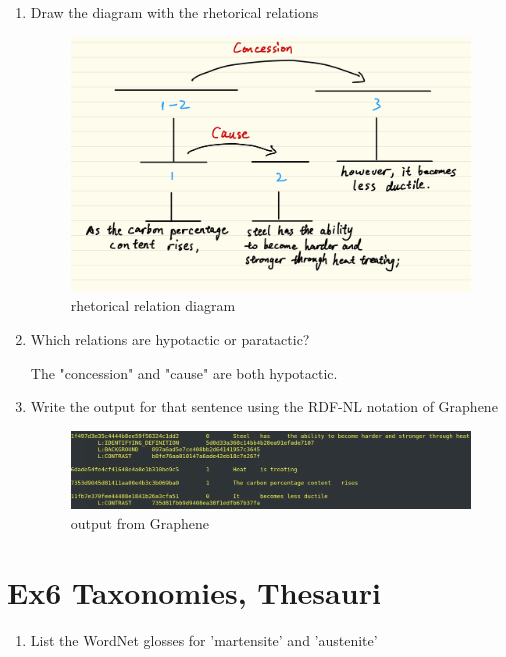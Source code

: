 \documentclass[12pt]{article}
\begin{document}
{\begin{enumerate}[1.]
	satellites: "As the carbon percentage content rises, steel has the ability to become harder 
	and stronger through heat treating;"
	\item Draw the diagram with the rhetorical relations
	\begin{figure}[ht]
		\centering
		\includegraphics[scale=0.15]{figs/rhetorical_structure.jpg}
		\caption{rhetorical relation diagram}
		\label{fig:label6}
	\end{figure}
	\item Which relations are hypotactic or paratactic?
	
	The "concession" and "cause" are both hypotactic.
	\item Write the output for that sentence using the RDF-NL notation of Graphene
	\begin{figure}[ht]
		\centering
		\includegraphics[scale=0.3]{figs/Graphene_output.png}
		\caption{output from Graphene}
		\label{fig:label7}
	\end{figure}
	
\end{enumerate}

\newpage
\section{Ex6 Taxonomies, Thesauri}
\label{sec: ex6}
\begin{enumerate}[1.]
	\item List the WordNet glosses for 'martensite' and 'austenite'
	

\end{enumerate}}
\end{document}
